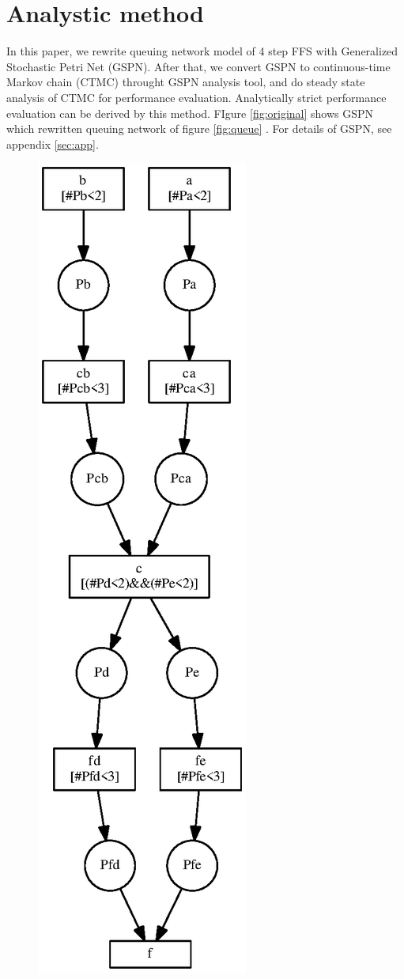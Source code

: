 \clearpage


\section{Analystic method}
In this paper, we rewrite queuing network model of 4 step FFS with Generalized Stochastic Petri Net (GSPN).
After that, we convert GSPN to continuous-time Markov chain (CTMC) throught GSPN analysis tool, and do steady state analysis of CTMC for performance evaluation.
Analytically strict performance evaluation can be derived by this method.
FIgure \ref{fig:original} shows GSPN which rewritten queuing network of figure \ref{fig:queue} .
For details of GSPN, see appendix \ref{sec:app}.

\begin{figure}[h]
	\begin{center}
		\includegraphics[height=0.6\vsize]{fig/original.eps}

\end{center}
\end{figure}
